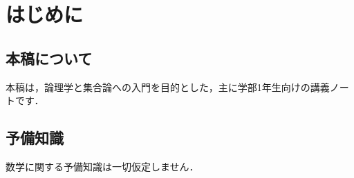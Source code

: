 \chapter*{はじめに}

\section*{本稿について}

本稿は，論理学と集合論への入門を目的とした，主に学部1年生向けの講義ノートです．

\section*{予備知識}

数学に関する予備知識は一切仮定しません．
